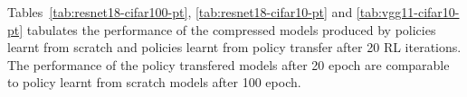 \documentclass[../main]{subfiles}
\begin{document}
        Tables~\ref{tab:resnet18-cifar100-pt}, \ref{tab:resnet18-cifar10-pt} and \ref{tab:vgg11-cifar10-pt} tabulates the performance of the compressed models produced by policies learnt from scratch and policies learnt from policy transfer after 20 RL iterations.
        The performance of the policy transfered models after 20 epoch are comparable to policy learnt from scratch models after 100 epoch.


        

\end{document}
